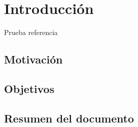 \documentclass[14pt]{extarticle}
\theoremstyle{definition}
\theoremstyle{remark}
\begin{document}
\section{Introducción}\label{sec:introduccion}
Prueba referencia \citep{wiki:test}
\subsection{Motivación}\label{sec:motivacion}
\subsection{Objetivos}\label{sec:objetivos}
\subsection{Resumen del documento}\label{sec:resumen}
\end{document}
